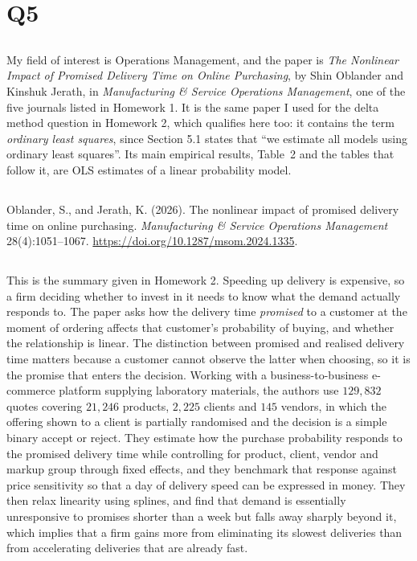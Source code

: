 \documentclass[11pt]{article}
\begin{document}
\clearpage
\section{Q5}
\label{sec:q5}

\subsection{}
My field of interest is Operations Management, and the paper is \emph{The
Nonlinear Impact of Promised Delivery Time on Online Purchasing}, by Shin
Oblander and Kinshuk Jerath, in \emph{Manufacturing \& Service Operations
Management}, one of the five journals listed in Homework 1. It is the same
paper I used for the delta method question in Homework 2, which qualifies here
too: it contains the term \emph{ordinary least squares}, since Section 5.1
states that ``we estimate all models using ordinary least squares''. Its main empirical results, Table~2 and
the tables that follow it, are OLS estimates of a linear probability model.

\subsection{}
Oblander, S., and Jerath, K. (2026). The nonlinear impact of promised delivery
time on online purchasing. \emph{Manufacturing \& Service Operations
Management} 28(4):1051--1067. \url{https://doi.org/10.1287/msom.2024.1335}.

\subsection{}
This is the summary given in Homework 2. Speeding up delivery is expensive, so
a firm deciding whether to invest in it needs to know what the demand actually
responds to. The paper asks how the delivery time \emph{promised} to a
customer at the moment of ordering affects that customer's probability of
buying, and whether the relationship is linear. The distinction between
promised and realised delivery time matters because a customer cannot observe
the latter when choosing, so it is the promise that enters the decision.
Working with a business-to-business e-commerce platform supplying laboratory
materials, the authors use $129{,}832$ quotes covering $21{,}246$ products,
$2{,}225$ clients and $145$ vendors, in which the offering shown to a client is
partially randomised and the decision is a simple binary accept or reject.
They estimate how the purchase probability responds to the promised delivery
time while controlling for product, client, vendor and markup group through
fixed effects, and they benchmark that response against price sensitivity so
that a day of delivery speed can be expressed in money. They then relax
linearity using splines, and find that demand is essentially unresponsive to
promises shorter than a week but falls away sharply beyond it, which implies
that a firm gains more from eliminating its slowest deliveries than from
accelerating deliveries that are already fast.
\end{document}
